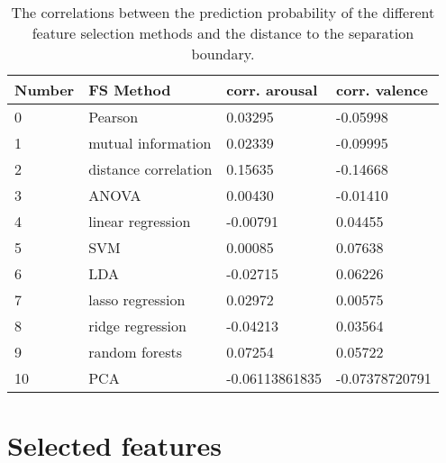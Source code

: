\begin{table}[H]
\centering
\begin{tabular}{llll}
\textbf{Number} & \textbf{FS Method}        & \textbf{corr. arousal} & \textbf{corr. valence} \\ \hline
0               & Pearson              & 0.03295          & -0.05998         \\
1               & mutual information   & 0.02339          & -0.09995         \\
2               & distance correlation & 0.15635          & -0.14668         \\
3               & ANOVA                & 0.00430          & -0.01410         \\
4               & linear regression    & -0.00791         & 0.04455          \\
5               & SVM                  & 0.00085          & 0.07638          \\
6               & LDA                  & -0.02715         & 0.06226          \\
7               & lasso regression     & 0.02972          & 0.00575          \\
8               & ridge regression     & -0.04213         & 0.03564          \\
9               & random forests       & 0.07254          & 0.05722          \\
10              & PCA                  & -0.06113861835   & -0.07378720791  
\end{tabular}
\caption{The correlations between the prediction probability of the different feature selection methods and the distance to the separation boundary\label{corrsCompLblGen}.}
\end{table}




\section{Selected features}

